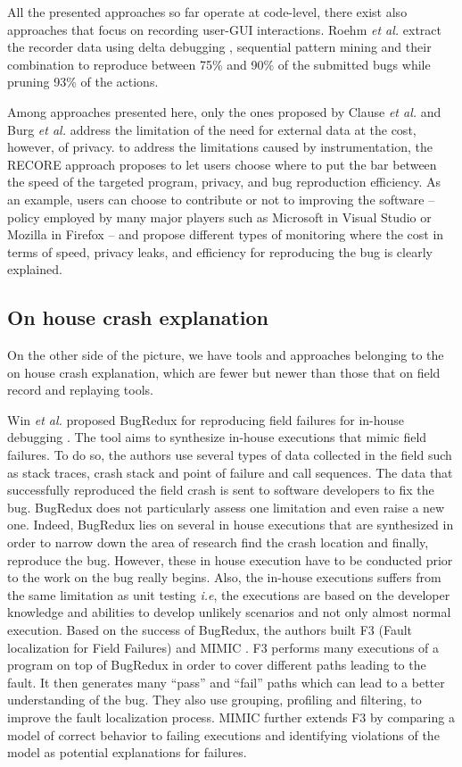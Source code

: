 \documentclass[times]{smrauth}
\begin{document}
All the presented approaches so far operate at code-level, there exist also approaches \cite{Herbold2011,Roehm2015} that focus on recording user-GUI interactions. 
Roehm {\it et al.} extract the recorder data using delta debugging \cite{Zeller2002}, sequential pattern mining and their combination to reproduce between 75\% and 90\% of the submitted bugs while pruning 93\% of the actions.

Among approaches presented here, only the ones proposed by Clause {\it et al.} and Burg {\it et al.} address the limitation of the need for external data  at the cost, however, of privacy. to address the limitations caused by instrumentation,  the RECORE approach proposes to let users choose where to put the bar between the speed of the targeted program, privacy, and bug reproduction efficiency. As an example, users can choose to contribute or not to improving the software -- policy employed by many major players such as Microsoft in Visual Studio or Mozilla in Firefox -- and propose different types of monitoring where the cost in terms of speed, privacy leaks, and efficiency for reproducing the bug is clearly explained.

 

\subsection{On house crash explanation}

On the other side of the picture, we have tools and approaches belonging to the on house crash explanation, which are fewer but newer than those that on field record and replaying tools.

Win {\it et al.} proposed BugRedux for reproducing field failures for in-house debugging \cite{Jin2012}.
The tool aims to synthesize in-house executions that mimic field failures. 
To do so, the authors use several types of data collected in the field such as stack traces, crash stack and point of failure and call sequences. 
The data that successfully reproduced the field crash is sent to software developers to fix the bug. 
BugRedux does not particularly assess one limitation and even raise a new one. 
Indeed, BugRedux lies on several in house executions that are synthesized in order to narrow down the area of research find the crash location and finally, reproduce the bug. 
However, these in house execution have to be conducted prior to the work on the bug really begins. 
Also, the in-house executions suffers from the same limitation as unit testing {\it i.e}, the executions are based on the developer knowledge and abilities to develop unlikely scenarios and not only almost normal execution. 
Based on the success of BugRedux, the authors built F3 (Fault
localization for Field Failures) \cite{Jin2013} and MIMIC \cite{Zuddas2014}. F3 performs many
executions of a program on top of BugRedux in order to cover
different paths leading to the fault.
 It then generates many
``pass'' and ``fail'' paths which can lead to a better understanding
of the bug. They also use grouping, profiling and filtering, to
improve the fault localization process. MIMIC further extends F3 by comparing a model of correct behavior to failing executions and identifying violations of the model as potential explanations for
failures.
\end{document}
